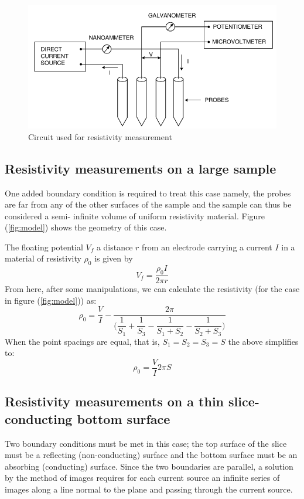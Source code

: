 \documentclass[%
 aip,
 amsmath,amssymb,
 reprint,%
]{revtex4-1}
\begin{document}
\begin{figure}
    \centering
    \includegraphics[scale = 0.55]{Figures/circuit-for-resistivity.png}
    \caption{Circuit used for resistivity measurement}
    \label{fig:circuit}
\end{figure}

\subsection{Resistivity measurements on a large sample}
One added boundary condition is required to treat this case namely, the probes are far
from any of the other surfaces of the sample and the sample can thus be considered a semi-
infinite volume of uniform resistivity material. Figure (\ref{fig:model}) shows the geometry of this case.

\par
The floating potential $V_f$ a distance $r$ from an electrode carrying a current $I$ in a
material of resistivity $\rho_0$ is given by
\begin{equation}
    V_f = \dfrac{\rho_0 I}{2 \pi r}
\end{equation}
From here, after some manipulations, we can calculate the resistivity (for the case in figure (\ref{fig:model})) as:
\begin{equation}
    \rho_0 = \dfrac{V}{I} - \dfrac{2 \pi}{\Bigg( \dfrac{1}{S_1} + \dfrac{1}{S_3} - \dfrac{1}{S_1 + S_2} - \dfrac{1}{S_2 + S_3} \Bigg)} 
\end{equation}
When the point spacings are equal, that is, $S_1 = S_2 = S_3 = S$ the above simplifies to:
\begin{equation}
    \rho_0 = \dfrac{V}{I} 2 \pi S
\end{equation}
\subsection{Resistivity measurements on a thin slice-conducting bottom surface}
Two boundary conditions must be met in this case; the top surface of the slice must be
a reflecting (non-conducting) surface and the bottom surface must be an absorbing
(conducting) surface. Since the two boundaries are parallel, a solution by the method of
images requires for each current source an infinite series of images along a line normal to the
plane and passing through the current source.
\end{document}
